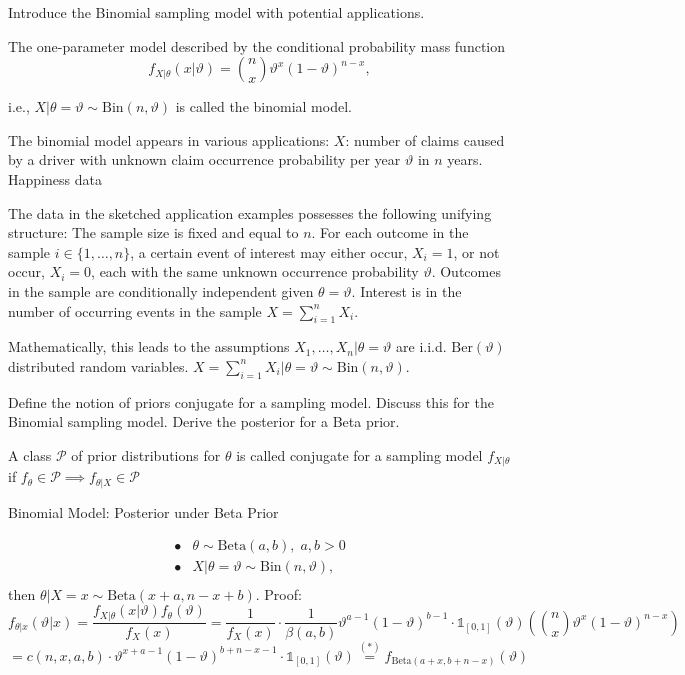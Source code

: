 Introduce the Binomial sampling model with potential applications.

The one-parameter model described by the conditional probability mass function
\[
f_{X|\theta}(x|\vartheta) = \binom{n}{x} \vartheta^x (1 - \vartheta)^{n-x},
\]

i.e., \(X|\theta = \vartheta \sim \text{Bin}(n, \vartheta)\) is called the binomial model.

The binomial model appears in various applications:
\(X\): number of claims caused by a driver with unknown claim occurrence probability per year \(\vartheta\) in \(n\) years.
Happiness data 

The data in the sketched application examples possesses the following unifying structure:
The sample size is fixed and equal to \(n\).
For each outcome in the sample \(i \in \{1, \ldots, n\}\), a certain event of interest may either occur, \(X_i = 1\), or not occur, \(X_i = 0\), each with the same unknown occurrence probability \(\vartheta\).
Outcomes in the sample are conditionally independent given \(\theta = \vartheta\).
Interest is in the number of occurring events in the sample \(X = \sum_{i=1}^{n} X_i\).

Mathematically, this leads to the assumptions
\(X_1, \ldots, X_n | \theta = \vartheta\) are i.i.d. \(\text{Ber}(\vartheta)\) distributed random variables.
\(X = \sum_{i=1}^{n} X_i | \theta = \vartheta \sim \text{Bin}(n, \vartheta)\).


Define the notion of priors conjugate for a sampling model. Discuss this for the
Binomial sampling model. Derive the posterior for a Beta prior.

A class \( \mathcal{P} \) of prior distributions for \( \theta \) is called conjugate for a sampling model \( f_{X|\theta} \) if
\( f_{\theta} \in \mathcal{P} \implies f_{\theta|X} \in \mathcal{P} \)

Binomial Model: Posterior under Beta Prior

\[
\begin{array}{ll}
    \bullet & \theta \sim \text{Beta}(a, b), \; a, b > 0 \\
    \bullet & X|\theta = \vartheta \sim \text{Bin}(n, \vartheta), \\
\end{array}
\]
then \(\theta | X = x \sim \text{Beta}(x + a, n - x + b)\).
Proof:
\[
f_{\theta|x}(\vartheta|x) = \frac{f_{X|\theta}(x|\vartheta) f_{\theta}(\vartheta)}{f_{X}(x)} 
= \frac{1}{f_{X}(x)} \cdot \frac{1}{\beta(a, b)} \vartheta^{a-1} (1 - \vartheta)^{b-1} \cdot \mathbb{1}_{[0,1]}(\vartheta) 
\left( \binom{n}{x} \vartheta^x (1 - \vartheta)^{n-x} \right)
\]
\[
= c(n, x, a, b) \cdot \vartheta^{x+a-1} (1 - \vartheta)^{b+n-x-1} \cdot \mathbb{1}_{[0,1]}(\vartheta) 
\stackrel{(*)}{=} f_{\text{Beta}(a+x,b+n-x)}(\vartheta)
\]


